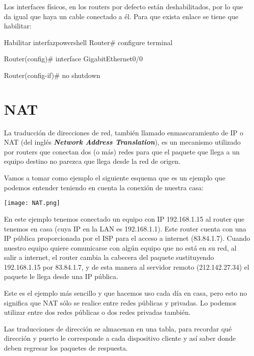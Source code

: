 Los interfaces físicos, en los routers por defecto están deshabilitados, por lo que da igual que haya un cable conectado a él. Para que exista enlace se tiene que habilitar:

\begin{mycode}{Habilitar interfaz}{powershell}{}
Router# configure terminal

Router(config)# interface GigabitEthernet0/0

Router(config-if)# no shutdown

\end{mycode}



\hypertarget{nat}{}
\section{NAT}
La traducción de direcciones de red, también llamado enmascaramiento de IP o NAT (del inglés \textit{\textbf{Network Address Translation}}), es un mecanismo utilizado por routers que conectan dos (o más) redes para que el paquete que llega a un equipo destino no parezca que llega desde la red de origen.

Vamos a tomar como ejemplo el siguiente esquema que es un ejemplo que podemos entender teniendo en cuenta la conexión de nuestra casa:

\begin{center}
    \vspace{-15pt}
    \texttt{[image: NAT.png]}
    \vspace{-25pt}
\end{center}

En este ejemplo tenemos conectado un equipo con IP 192.168.1.15 al router que tenemos en casa (cuya IP en la LAN es 192.168.1.1). Este router cuenta con una IP pública proporcionada por el ISP para el acceso a internet (83.84.1.7). Cuando nuestro equipo quiere comunicarse con algún equipo que no está en su red, al salir a internet, el router cambia la cabecera del paquete sustituyendo 192.168.1.15 por 83.84.1.7, y de esta manera al servidor remoto (212.142.27.34) el paquete le llega desde una IP pública.

Este es el ejemplo más sencillo y que hacemos uso cada día en casa, pero esto no significa que NAT sólo se realice entre redes públicas y privadas. Lo podemos utilizar entre dos redes públicas o dos redes privadas también.

Las traducciones de dirección se almacenan en una tabla, para recordar qué dirección y puerto le corresponde a cada dispositivo cliente y así saber donde deben regresar los paquetes de respuesta.

